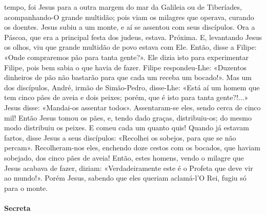 \begin{paracol}{2}
{ tempo, foi Jesus para a outra margem do mar da Galileia ou de Tiberíades, acompanhando-O grande multidão; pois viam os milagres que operava, curando os doentes. Jesus subiu a um monte, e aí se assentou com seus discípulos. Ora a Páscoa, que era a principal festa dos judeus, estava. Próxima. E, levantando Jesus os olhos, viu que grande multidão de povo estava com Ele. Então, disse a Filipe: «Onde compraremos pão para tanta gente?». Ele dizia isto para experimentar Filipe, pois bem sabia o que havia de fazer. Filipe respondeu-Lhe: «Duzentos dinheiros de pão não bastarão para que cada um receba um bocado!». Mas um dos discípulos, André, irmão de Simão-Pedro, disse-Lhe: «Está aí um homem que tem cinco pães de aveia e dois peixes; porém, que é isto para tanta gente?!...» Jesus disse: «Mandai-os assentar todos». Assentaram-se eles, sendo cerca de cinco mil! Então Jesus tomou os pães, e, tendo dado graças, distribuiu-os; do mesmo modo distribuiu os peixes. E comeu cada um quanto quis! Quando já estavam fartos, disse Jesus a seus discípulos: «Recolhei os sobejos, para que se não percam». Recolheram-nos eles, enchendo doze cestos com os bocados, que haviam sobejado, dos cinco pães de aveia! Então, estes homens, vendo o milagre que Jesus acabava de fazer, diziam: «Verdadeiramente este é o Profeta que deve vir ao mundo!». Porém Jesus, sabendo que eles queriam aclamá-l’O Rei, fugiu só para o monte.
}\end{paracol}

\begin{paracol}{2}\switchcolumn{}\end{paracol}

\paragraph{Secreta}
\begin{paracol}{2}\switchcolumn{}\end{paracol}

